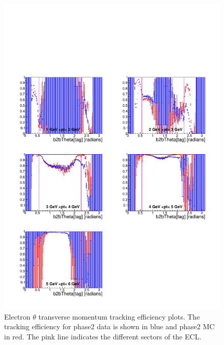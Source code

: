 \documentclass[a4paper,11pt,twosided,final,german,openbib,pdftex,listof=totoc,bibliography=totoc]{scrbook}
\begin{document}
\begin{figure}[!htbp]
	\centering
	\includegraphics[width=\textwidth]{Plots/master/xPtMThetaem}
	\caption[Transverse Momentum $\theta$ Electron Efficiency Phase2]{Electron $\theta$ transverse momentum tracking efficiency plots. The tracking efficiency for phase2 data is shown in blue and phase2 MC in red. The pink line indicates the different sectors of the ECL.}
\end{figure}
\end{document}
